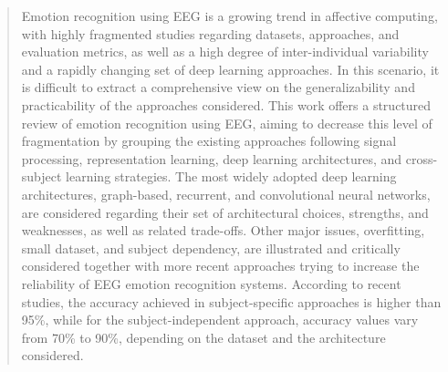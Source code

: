 \documentclass{WileyMSP-template}
\begin{document}
\begin{abstract}
Emotion recognition using EEG is a growing trend in affective computing, with highly fragmented studies regarding datasets, approaches, and evaluation metrics, as well as a high degree of inter-individual variability and a rapidly changing set of deep learning approaches. In this scenario, it is difficult to extract a comprehensive view on the generalizability and practicability of the approaches considered. This work offers a structured review of emotion recognition using EEG, aiming to decrease this level of fragmentation by grouping the existing approaches following signal processing, representation learning, deep learning architectures, and cross-subject learning strategies. The most widely adopted deep learning architectures, graph-based, recurrent, and convolutional neural networks, are considered regarding their set of architectural choices, strengths, and weaknesses, as well as related trade-offs. Other major issues, overfitting, small dataset, and subject dependency, are illustrated and critically considered together with more recent approaches trying to increase the reliability of EEG emotion recognition systems. According to recent studies, the accuracy achieved in subject-specific approaches is higher than 95\%, while for the subject-independent approach, accuracy values vary from 70\% to 90\%, depending on the dataset and the architecture considered.
\end{abstract}


\end{document}
